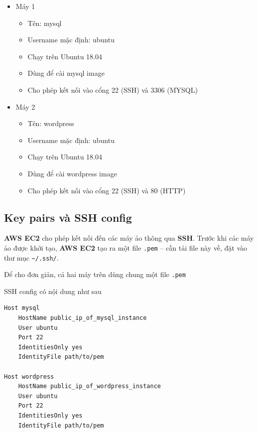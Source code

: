\documentclass{article}
\begin{document}
\begin{itemize}
    \item Máy 1
    \begin{itemize}
        \item Tên: mysql
        \item Username mặc định: ubuntu
        \item Chạy trên Ubuntu 18.04
        \item Dùng để cài mysql image
        \item Cho phép kết nối vào cổng 22 (SSH) và 3306 (MYSQL)
    \end{itemize}
    \item Máy 2
    \begin{itemize}
        \item Tên: wordpress
        \item Username mặc định: ubuntu
        \item Chạy trên Ubuntu 18.04
        \item Dùng để cài wordpress image
        \item Cho phép kết nối vào cổng 22 (SSH) và 80 (HTTP)
    \end{itemize}
\end{itemize}

\subsection{Key pairs và SSH config}

\par \textbf{AWS EC2} cho phép kết nối đến các máy ảo thông qua \textbf{SSH}. Trước khi các máy ảo được khởi tạo, \textbf{AWS EC2} tạo ra một file \texttt{.pem} -- cần tải file này về, đặt vào thư mục \texttt{\textasciitilde/.ssh/}.

\par Để cho đơn giản, cả hai máy trên dùng chung một file \texttt{.pem}

\par SSH config có nội dung như sau

\begin{Verbatim}[frame=single]
Host mysql
    HostName public_ip_of_mysql_instance
    User ubuntu
    Port 22
    IdentitiesOnly yes
    IdentityFile path/to/pem

Host wordpress
    HostName public_ip_of_wordpress_instance
    User ubuntu
    Port 22
    IdentitiesOnly yes
    IdentityFile path/to/pem
\end{Verbatim}
\end{document}
